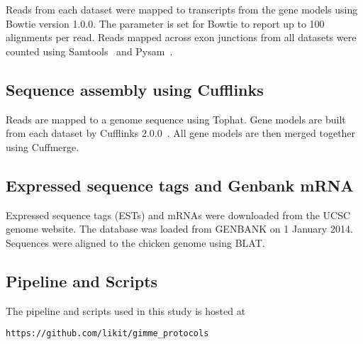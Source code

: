 Reads from each dataset were mapped to transcripts from the gene models using
Bowtie version 1.0.0. The parameter is set for Bowtie to report up to 100
alignments per read.  Reads mapped across exon junctions from all datasets were
counted using Samtools~\cite{li2009sequence} and Pysam~\cite{pysam}.

\subsection{Sequence assembly using Cufflinks}
Reads are mapped to a genome sequence using Tophat.  Gene models are built from
each dataset by Cufflinks 2.0.0~\cite{Trapnell:2010kd}.  All gene models are
then merged together using Cuffmerge.

\subsection{Expressed sequence tags and Genbank mRNA}
Expressed sequence tags (ESTs) and mRNAs were downloaded from the UCSC genome
website.  The database was loaded from GENBANK on 1 January 2014.  Sequences
were aligned to the chicken genome using BLAT.

\subsection{Pipeline and Scripts}

The pipeline and scripts used in this study is hosted at

\texttt{https://github.com/likit/gimme\_protocols}
